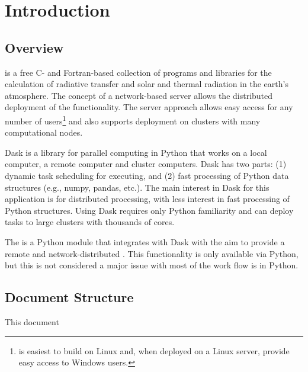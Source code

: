 
\chapter{Introduction}
\label{chap:Introduction}

\section{Overview}
\label{sec:introductionOverview}

\libradtran{} \cite{EmdeLibRadtran2016,libRadtran2005} is a free C- and Fortran-based collection of programs and libraries for the calculation of radiative transfer and solar and thermal radiation in the earth's atmosphere.
The concept of a network-based \libradtran{} server allows the  distributed deployment of the \libradtran{} functionality. The server approach allows easy access for any number of users\footnote{\libradtran{} is easiest to build on Linux and, when deployed on a Linux server, provide easy access to Windows users.} and also supports deployment on clusters with many computational nodes.

Dask \cite{daskhomepage2020} is a library for parallel computing in Python that works on a local computer, a remote computer and cluster computers.
Dask has two parts: (1) dynamic task scheduling for executing, and (2) fast processing of Python data structures (e.g., numpy, pandas, etc.).  The main interest in Dask for this application is for distributed  processing, with less interest in fast processing of Python structures. Using Dask requires only Python familiarity and can deploy tasks to large clusters with thousands of cores.

The \libraddask{}  is a Python module that integrates \libradtran{} with Dask with the aim to provide a remote and network-distributed \libradtran{}. This functionality is only available via Python, but this is not considered a major issue with most of the work flow is in Python.

\section{Document Structure}
\label{sec:DocumentStructure}


This   document